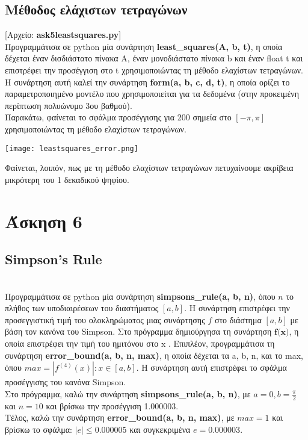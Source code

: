 \documentclass{article}
\newcommand{\lt}{\latintext}
\newcommand{\gt}{\greektext}
\begin{document}
\subsection{Μέθοδος ελάχιστων τετραγώνων}
[Αρχείο: \lt \textbf{ask5leastsquares.py}] \gt \\
Προγραμμάτισα σε \lt python \gt μία συνάρτηση \lt \textbf{least{\_}squares(A, b, t)}, \gt η οποία δέχεται έναν δισδιάστατο πίνακα Α, έναν μονοδιάστατο πίνακα \lt b \gt και έναν \lt float t \gt και επιστρέφει την προσέγγιση στο \lt t \gt χρησιμοποιώντας τη μέθοδο ελαχίστων τετραγώνων. Η συνάρτηση αυτή καλεί την συνάρτηση \lt \textbf{form(a, b, c, d, t)}, \gt η οποία ορίζει το παραμετροποιημένο μοντέλο που χρησιμοποιείται για τα δεδομένα (στην προκειμένη περίπτωση πολυώνυμο 3ου βαθμού).\\
Παρακάτω, φαίνεται το σφάλμα προσέγγισης για 200 σημεία στο $[-\pi,\pi]$ χρησιμοποιώντας τη μέθοδο ελαχίστων τετραγώνων.
\begin{center}
\texttt{[image: leastsquares\_error.png]}
\end{center}
Φαίνεται, λοιπόν, πως με τη μέθοδο ελαχίστων τετραγώνων πετυχαίνουμε ακρίβεια μικρότερη του 1 δεκαδικού ψηφίου.


\section{Άσκηση 6}

\lt
\subsection{Simpson's Rule}
\gt
[Αρχείο: \lt \textbf{ask6SimpsonsRule.py}] \gt \\
Προγραμμάτισα σε \lt python \gt μία συνάρτηση \lt \textbf{simpsons{\_}rule(a, b, n)}, \gt όπου $n$ το πλήθος των υποδιαιρέσεων του διαστήματος $[a,b]$. Η συνάρτηση επιστρέφει την προσεγγιστική τιμή του ολοκληρώματος μιας συνάρτησης $f$ στο διάστημα $[a,b]$ με βάση τον κανόνα του \lt Simpson. \gt Στο πρόγραμμα δημιούργησα τη συνάρτηση \lt $\textbf{f(x)}$, \gt η οποία επιστρέφει την τιμή του ημιτόνου στο \lt x \gt . Επιπλέον, προγραμμάτισα τη συνάρτηση \lt \textbf{error{\_}bound(a, b, n, max)}, \gt η οποία δέχεται τα \lt a, b, n, \gt και το \lt max, \gt όπου $max=|f^{(4)}(x)|: x\in[a,b]$. Η συνάρτηση αυτή επιστρέφει το σφάλμα προσέγγισης του κανόνα \lt Simpson. \gt \\
Στο πρόγραμμα, καλώ την συνάρτηση \lt \textbf{simpsons{\_}rule(a, b, n)}, \gt με $a=0, b=\frac{\pi}{2}$ και $n=10$ και βρίσκω την προσέγγιση 1.000003. \\
Τέλος, καλώ την συνάρτηση \lt \textbf{error{\_}bound(a, b, n, max)}, \gt με $max=1$ και βρίσκω το σφάλμα: $|e|\leq0.000005$ και συγκεκριμένα $e=0.000003$.
\end{document}
